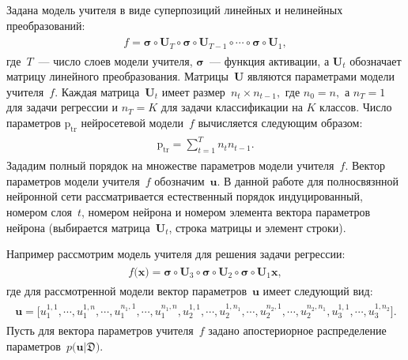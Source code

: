 \documentclass[12pt]{a&t}
\begin{document}
Задана модель учителя в виде суперпозиций линейных и нелинейных преобразований:
\begin{gather}
\label{eq:st:2}
\begin{aligned}
f = \bm{\sigma} \circ \mathbf{U}_T \circ \bm{\sigma} \circ \mathbf{U}_{T-1} \circ \cdots \circ \bm{\sigma} \circ \mathbf{U}_1,
\end{aligned}
\end{gather}
где~$T$~--- число слоев модели учителя, $\bm{\sigma}$~--- функция активации, а $\mathbf{U}_t$ обозначает матрицу линейного преобразования. Матрицы~$\mathbf{U}$ являются параметрами модели учителя~$f$. Каждая матрица~$\mathbf{U}_t$ имеет размер~$n_t\times n_{t-1},$ где $n_0=n,$ а  $n_T={1}$ для задачи регрессии и $n_T=K$ для задачи классификации на $K$ классов. Число параметров $\text{p}_{\text{tr}}$ нейросетевой модели~$f$ вычисляется следующим образом:
\begin{gather}
\label{eq:st:2}
\begin{aligned}
\text{p}_{\text{tr}} = \sum_{t=1}^{T}n_tn_{t-1}.
\end{aligned}
\end{gather}
Зададим полный порядок на множестве параметров модели учителя~$f$. Вектор параметров модели учителя~$f$ обозначим~$\mathbf{u}$. В данной работе для полносвязнной нейронной сети рассматривается естественный порядок индуцированный, номером слоя~$t$, номером нейрона и номером элемента вектора параметров нейрона (выбирается матрица~$\mathbf{U}_t$, строка матрицы и элемент строки).

Например рассмотрим модель учителя для решения задачи регрессии:
\begin{gather}
\label{eq:st:3}
\begin{aligned}
f\bigr(\mathbf{x}\bigr) = \bm{\sigma} \circ \mathbf{U}_3\circ \bm{\sigma} \circ \mathbf{U}_2\circ\bm{\sigma}\circ \mathbf{U}_1\mathbf{x},
\end{aligned}
\end{gather}
где для рассмотренной модели вектор параметров~$\mathbf{u}$ имеет следующий вид:
\begin{gather}
\label{eq:st:4}
\begin{aligned}
\mathbf{u} = \bigr[u_1^{1,1}, \cdots, u_1^{1,n},
                                               \cdots, 
                             u_1^{n_1,1}, \cdots, u_1^{n_1,n},  
                             u_2^{1, 1}, \cdots, u_2^{1, n_1}, 
                                                \cdots, 
                            u_2^{n_2, 1}, \cdots, u_2^{n_2, n_1},
                            u_3^{1, 1}, \cdots, u_3^{1, n_2}\bigr].
\end{aligned}
\end{gather}
Пусть для вектора параметров учителя~$f$ задано апостериорное распределение параметров~$p\bigr(\mathbf{u}|\mathfrak{D}\bigr).$
\end{document}
